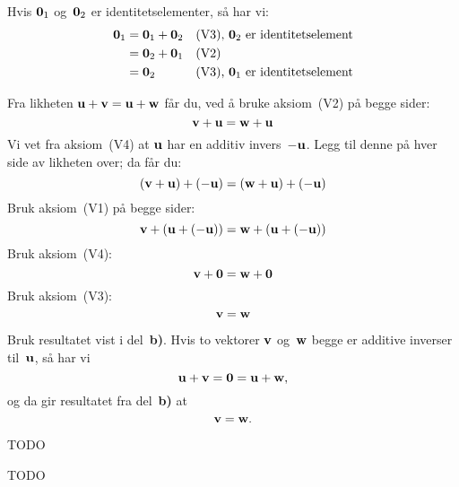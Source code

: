 \begin{losning}
\begin{punkt}
Hvis $\mathbf{0}_1$ og~$\mathbf{0}_2$ er identitetselementer, så har vi:
\begin{align*}
\mathbf{0}_1
 &= \mathbf{0}_1 + \mathbf{0}_2 &&\text{(V3), $\mathbf{0}_2$ er identitetselement} \\
 &= \mathbf{0}_2 + \mathbf{0}_1 &&\text{(V2)} \\
 &= \mathbf{0}_2           &&\text{(V3), $\mathbf{0}_1$ er identitetselement}
\end{align*}
\end{punkt}
\begin{punkt}
Fra likheten $\mathbf{u} + \mathbf{v} = \mathbf{u} + \mathbf{w}$ får du, ved å bruke
aksiom~(V2) på begge sider:
\[
\mathbf{v} + \mathbf{u} = \mathbf{w} + \mathbf{u}
\]
Vi vet fra aksiom~(V4) at $\mathbf{u}$ har en additiv invers~$-\mathbf{u}$.
Legg til denne på hver side av likheten over; da får du:
\[
(\mathbf{v} + \mathbf{u}) + (-\mathbf{u}) = (\mathbf{w} + \mathbf{u}) + (-\mathbf{u})
\]
Bruk aksiom~(V1) på begge sider:
\[
\mathbf{v} + (\mathbf{u} + (-\mathbf{u})) = \mathbf{w} + (\mathbf{u} + (-\mathbf{u}))
\]
Bruk aksiom~(V4):
\[
\mathbf{v} + \mathbf{0} = \mathbf{w} + \mathbf{0}
\]
Bruk aksiom~(V3):
\[
\mathbf{v} = \mathbf{w}
\]
\end{punkt}
\begin{punkt}
Bruk resultatet vist i del~\textbf{b)}.  Hvis to vektorer $\mathbf{v}$
og~$\mathbf{w}$ begge er additive inverser til~$\mathbf{u}$, så har vi
\[
\mathbf{u} + \mathbf{v} = \mathbf{0} = \mathbf{u} + \mathbf{w},
\]
og da gir resultatet fra del~\textbf{b)} at
\[
\mathbf{v} = \mathbf{w}.
\]
\end{punkt}
\end{losning}


\begin{oppgave}
\end{oppgave}

\begin{losning}
TODO
\end{losning}


\begin{oppgave}
\end{oppgave}

\begin{losning}
TODO
\end{losning}


